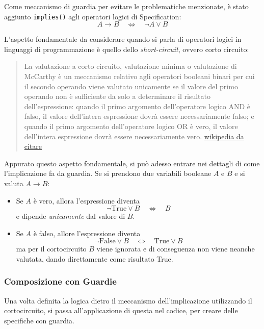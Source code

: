 \documentclass[12pt,a4paper]{article}
\begin{document}
                


Come meccanismo di guardia per evitare le problematiche menzionate, è stato aggiunto \texttt{implies()} agli operatori logici di Specification:
\begin{equation*}
    A \rightarrow B \quad\iff\quad  \lnot A \lor B
\end{equation*}

L'aspetto fondamentale da considerare quando si parla di operatori logici in linguaggi di programmazione è quello dello \textit{short-circuit}, ovvero corto circuito:

\begin{quote}
    La valutazione a corto circuito, valutazione minima o valutazione di McCarthy è un meccanismo relativo agli operatori booleani binari per cui il secondo operando viene valutato unicamente se il valore del primo operando non è sufficiente da solo a determinare il risultato dell'espressione: quando il primo argomento dell'operatore logico AND è falso, il valore dell'intera espressione dovrà essere necessariamente falso; e quando il primo argomento dell'operatore logico OR è vero, il valore dell'intera espressione dovrà essere necessariamente vero. \href{https://it.wikipedia.org/wiki/Valutazione_a_corto_circuito}{wikipedia da citare}
\end{quote}

Appurato questo aspetto fondamentale, si può adesso entrare nei dettagli di come l'implicazione fa da guardia. Se si prendono due variabili booleane \(A\) e \(B\) e si valuta \(A\rightarrow B\):
\begin{itemize}
    \item Se \(A\) è vero, allora l'espressione diventa \[\lnot \mathrm{True}\lor B\quad \iff \quad B \] e dipende \textit{unicamente} dal valore di \(B\).
    \item Se \(A\) è falso, allore l'espressione diventa \[\lnot \mathrm{False}\lor B \quad \iff \quad \mathrm{True} \lor B\]ma per il cortocircuito \(B\) viene ignorata e di conseguenza non viene neanche valutata, dando direttamente come risultato \textrm{True}.
\end{itemize}

\subsubsection{Composizione con Guardie}
Una volta definita la logica dietro il meccanismo dell'implicazione utilizzando il cortocircuito, si passa all'applicazione di questa nel codice, per creare delle specifiche con guardia.
\end{document}
